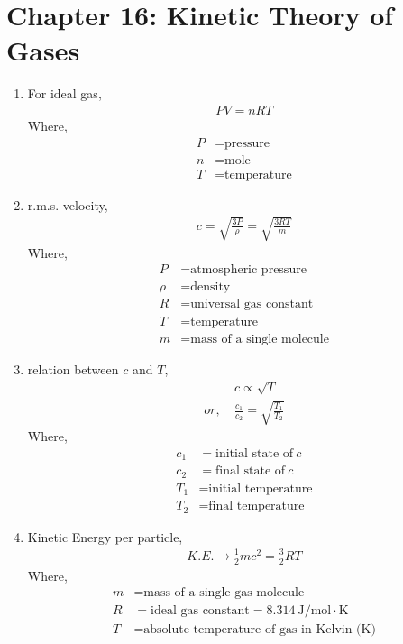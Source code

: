 \documentclass[12pt]{article}
\begin{document}
\section{Chapter 16: Kinetic Theory of Gases}
\begin{enumerate}[label=\roman*.]
	\item
		For ideal gas,
		\[
		\begin{aligned}
			PV = nRT
		\end{aligned}
		\]
		Where,
		\begin{align*}
			P &= \text{pressure} \\
			n &= \text{mole} \\
			T &= \text{temperature}
		\end{align*}

	\item
		r.m.s. velocity,
		\[
		\begin{aligned}
			c = \sqrt{\frac{3P}{\rho}} = \sqrt{\frac{3RT}{m}}
		\end{aligned}
		\]
		Where,
		\begin{align*}
			P &= \text{atmospheric pressure} \\
			\rho &= \text{density} \\
			R &= \text{universal gas constant} \\
			T &= \text{temperature} \\
			m &= \text{mass of a single molecule}
		\end{align*}

	\item
		relation between $c$ and $T$,
		\[
		\begin{aligned}
			& c \propto \sqrt{T} \\
			or, \ & \frac{c_1}{c_2} = \sqrt{\frac{T_1}{T_2}}
		\end{aligned}
		\]
		Where,
		\begin{align*}
			c_1 &= \text{initial state of}\ c \\
			c_2 &= \text{final state of}\ c \\
			T_1 &= \text{initial temperature} \\
			T_2 &= \text{final temperature}
		\end{align*}

	\item
		Kinetic Energy per particle,
		\[
		\begin{aligned}
			K.E. \rightarrow \frac{1}{2} mc^2 = \frac{3}{2}RT
		\end{aligned}
		\]
		Where,
		\begin{align*}
			m &= \text{mass of a single gas molecule} \\
			R &= \text{ideal gas constant} = 8.314 \ \text{J/mol} \cdot \text{K} \\
			T &= \text{absolute temperature of gas in Kelvin (K)}
		\end{align*}


\end{enumerate}
\end{document}
